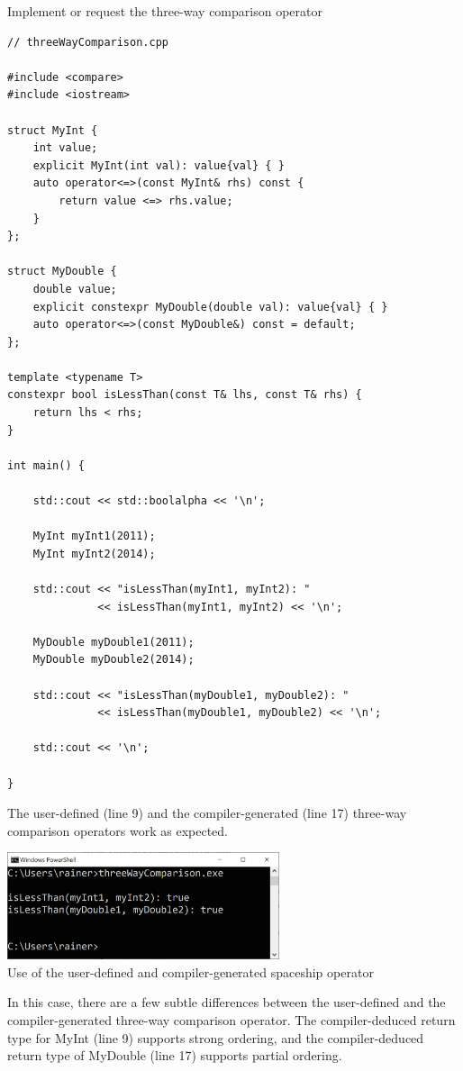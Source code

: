 \noindent
Implement or request the three-way comparison operator
\begin{lstlisting}[style=styleCXX]
// threeWayComparison.cpp

#include <compare>
#include <iostream>

struct MyInt {
	int value;
	explicit MyInt(int val): value{val} { }
	auto operator<=>(const MyInt& rhs) const {
		return value <=> rhs.value;
	}
};

struct MyDouble {
	double value;
	explicit constexpr MyDouble(double val): value{val} { }
	auto operator<=>(const MyDouble&) const = default;
};

template <typename T>
constexpr bool isLessThan(const T& lhs, const T& rhs) {
	return lhs < rhs;
}

int main() {

	std::cout << std::boolalpha << '\n';
	
	MyInt myInt1(2011);
	MyInt myInt2(2014);
	
	std::cout << "isLessThan(myInt1, myInt2): "
	          << isLessThan(myInt1, myInt2) << '\n';
	
	MyDouble myDouble1(2011);
	MyDouble myDouble2(2014);
	
	std::cout << "isLessThan(myDouble1, myDouble2): "
	          << isLessThan(myDouble1, myDouble2) << '\n';
	
	std::cout << '\n';

}
\end{lstlisting}

The user-defined (line 9) and the compiler-generated (line 17) three-way comparison operators work as expected.

\begin{center}
\includegraphics[width=0.6\textwidth]{content/3/chapter4/images/28.png}\\
Use of the user-defined and compiler-generated spaceship operator
\end{center}

In this case, there are a few subtle differences between the user-defined and the compiler-generated three-way comparison operator. The compiler-deduced return type for MyInt (line 9) supports strong ordering, and the compiler-deduced return type of MyDouble (line 17) supports partial ordering.

